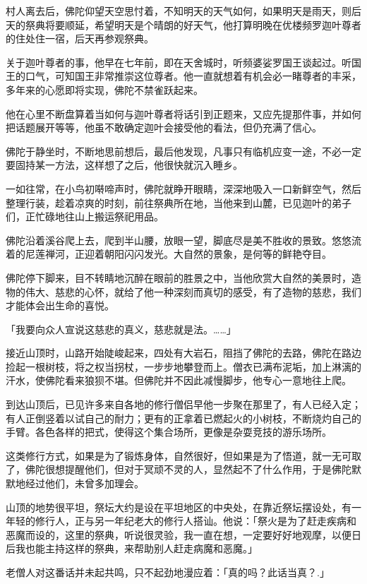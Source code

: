 \documentclass[twoside,openany]{book}
\begin{document}
村人离去后，佛陀仰望天空思忖着，不知明天的天气如何，如果明天是雨天，则后天的祭典将要顺延，希望明天是个晴朗的好天气，他打算明晚在优楼频罗迦叶尊者的住处住一宿，后天再参观祭典。

关于迦叶尊者的事，他早在七年前，即在天舍城时，听频婆娑罗国王谈起过。听国王的口气，可知国王非常推崇这位尊者。他一直就想着有机会必一睹尊者的丰采，多年来的心愿即将实现，佛陀不禁雀跃起来。

他在心里不断盘算着当如何与迦叶尊者将话引到正题来，又应先提那件事，并如何把话题展开等等，他虽不敢确定迦叶会接受他的看法，但仍充满了信心。

佛陀于静坐时，不断地思前想后，最后他发现，凡事只有临机应变一途，不必一定要固持某一方法，这样想了之后，他很快就沉入睡乡。

一如往常，在小鸟初啭啼声时，佛陀就睁开眼睛，深深地吸入一口新鲜空气，然后整理行装，趁着凉爽的时刻，前往祭典所在地，当他来到山麓，已见迦叶的弟子们，正忙碌地往山上搬运祭祀用品。

佛陀沿着溪谷爬上去，爬到半山腰，放眼一望，脚底尽是美不胜收的景致。悠悠流着的尼莲禅河，正迎着朝阳闪闪发光。大自然的景象，是何等的鲜艳夺目。

佛陀停下脚来，目不转睛地沉醉在眼前的胜景之中，当他欣赏大自然的美景时，造物的伟大、慈悲的心怀，就给了他一种深刻而真切的感受，有了造物的慈悲，我们才能体会出生命的喜悦。

「我要向众人宣说这慈悲的真义，慈悲就是法。……」

接近山顶时，山路开始陡峻起来，四处有大岩石，阻挡了佛陀的去路，佛陀在路边捡起一根树枝，将之权当拐杖，一步步地攀登而上。僧衣已满布泥垢，加上淋漓的汗水，使佛陀看来狼狈不堪。但佛陀并不因此减慢脚步，他专心一意地往上爬。

到达山顶后，已见许多来自各地的修行僧侣早他一步聚在那里了，有人已经入定；有人正倒竖着以试自己的耐力；更有的正拿着已燃起火的小树枝，不断烧灼自己的手臂。各色各样的把式，使得这个集合场所，更像是杂耍竞技的游乐场所。

这类修行方式，如果是为了锻炼身体，自然很好，但如果是为了悟道，就一无可取了，佛陀很想提醒他们，但对于冥顽不灵的人，显然起不了什么作用，于是佛陀默默地经过他们，未曾多加理会。

山顶的地势很平坦，祭坛大约是设在平坦地区的中央处，在靠近祭坛摆设处，有一年轻的修行人，正与另一年纪老大的修行人搭讪。他说：「祭火是为了赶走疾病和恶魔而设的，这里的祭典，听说很灵验，我一直在想，一定要好好地观摩，以便日后我也能主持这样的祭典，来帮助别人赶走病魔和恶魔。」

老僧人对这番话并未起共鸣，只不起劲地漫应着：「真的吗？此话当真？.」
\end{document}
